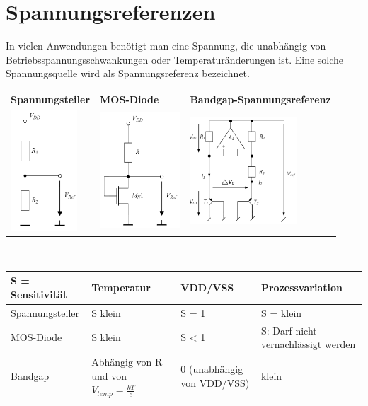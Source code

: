 \section{Spannungsreferenzen}
In vielen Anwendungen benötigt man eine Spannung, die unabhängig von Betriebsspannungsschwankungen oder Temperaturänderungen ist. Eine solche Spannungsquelle wird als Spannungsreferenz bezeichnet.\\
\begin{tabular}{l l l}
\textbf{Spannungsteiler} & \textbf{MOS-Diode} & \textbf{Bandgap-Spannungsreferenz} \\
\includegraphics[width=2.5cm]{Spannungsteiler.png} &
\includegraphics[width=3cm]{MOS-Spannungsreferenz.png} &
\includegraphics[width=4cm]{Bandgap Schaltung.png}\\
\end{tabular}\\
\begin{tabular}{|l|l|l|l|}
\hline
S = Sensitivität & \textbf{Temperatur} & \textbf{VDD/VSS} & \textbf{Prozessvariation}\\
\hline
Spannungsteiler & S klein & S = 1 & S = klein\\
\hline
MOS-Diode & S klein & S < 1 & S: Darf nicht vernachlässigt werden\\
\hline
Bandgap & \makecell[l]{Abhängig von R\\ und von $V_{temp} = \frac{kT}{e}$} & 0 (unabhängig von VDD/VSS) & klein\\
\hline
\end{tabular}
